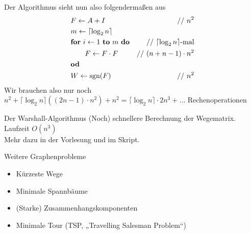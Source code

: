 \begin{frame}
	Der Algorithmus sieht nun also folgendermaßen aus 
	\begin{align*}
		&F \leftarrow A + I & \text{// $n^2$} \\ 
		&m \leftarrow \lceil \log_2 n \rceil \\
		&\mathbf{for}\ i \leftarrow 1\ \mathbf{to} \ m \ \mathbf{do} & \text{// $\lceil \log_2 n \rceil$-mal} \\
		&\hspace*{2em} F \leftarrow F \cdot F & \text{// $(n+n-1)\cdot n^2$} \\
		&\mathbf{od}\\
		& W\leftarrow \mathop{\text{sgn}}(F) 	& \text{// $n^2$}
	\end{align*} \pause
	Wir brauchen also nur noch $n^2 + \lceil \log_2 n \rceil \left( (2n-1)\cdot n^2 \right) +n^2 = \lceil \log_2 n \rceil \cdot 2n^3 + \dots $ Rechenoperationen  \\
\end{frame}

\begin{frame}{Der Warshall-Algorithmus}
	(Noch) schnellere Berechnung der Wegematrix. Laufzeit $O(n^3)$\\
	Mehr dazu in der Vorlesung und im Skript.
\end{frame}



\begin{frame}{Weitere Graphenprobleme}
	\begin{itemize}[<+->]
		\item Kürzeste Wege
		\item Minimale Spannbäume
		\item (Starke) Zusammenhangskomponenten
		\item Minimale Tour (TSP, „Travelling Salesman Problem“)
	\end{itemize}
	

\end{frame}


